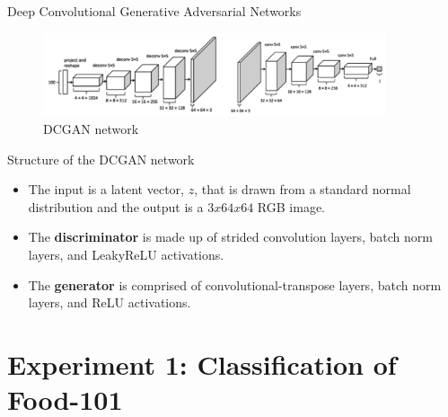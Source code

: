 \documentclass[10pt]{beamer}
\begin{document}
{
\begin{frame}{Deep Convolutional Generative Adversarial Networks}
        \begin{figure}[htbp] 
  \centering
     \includegraphics[width=0.9\textwidth,height=0.2\textwidth]{pic/structure_dcgan.png}
       \caption{DCGAN network}
  \label{fig:Bild1}
\end{figure}
    \begin{block}{Structure of the DCGAN network}
	\begin{itemize}[<+- | alert@+>]
	\item The input is a latent vector, $z$, that is drawn from a standard normal distribution and the output is a $3x64x64$ RGB image.
    \item The \textbf{discriminator} is made up of strided convolution layers, batch norm layers, and LeakyReLU activations. 
    \item The \textbf{generator} is comprised of convolutional-transpose layers, batch norm layers, and ReLU activations.
  \end{itemize}
    \end{block}
  
\end{frame}
}

\section{Experiment 1: Classification of Food-101}
\end{document}
